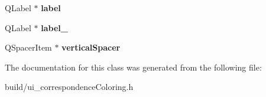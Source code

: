 \begin{DoxyCompactItemize}
\item 
\hypertarget{class_ui___correspondence_coloring_widget_ab6f8c37719805077b326d3c7ccb3e067}{}Q\+Label $\ast$ {\bfseries label}\label{class_ui___correspondence_coloring_widget_ab6f8c37719805077b326d3c7ccb3e067}

\item 
\hypertarget{class_ui___correspondence_coloring_widget_adfcd3e94c1faa004607e7c58c64e12b8}{}Q\+Label $\ast$ {\bfseries label\+\_}\label{class_ui___correspondence_coloring_widget_adfcd3e94c1faa004607e7c58c64e12b8}

\item 
\hypertarget{class_ui___correspondence_coloring_widget_a53af4eda1b667acb2616e4df753c4026}{}Q\+Spacer\+Item $\ast$ {\bfseries vertical\+Spacer}\label{class_ui___correspondence_coloring_widget_a53af4eda1b667acb2616e4df753c4026}

\end{DoxyCompactItemize}


The documentation for this class was generated from the following file\+:\begin{DoxyCompactItemize}
\item 
build/ui\+\_\+correspondence\+Coloring.\+h\end{DoxyCompactItemize}
